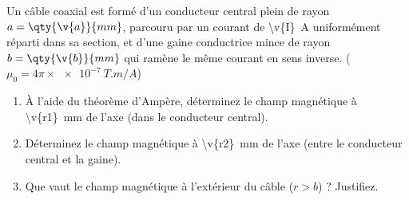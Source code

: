 Un câble coaxial est formé d'un conducteur central plein de rayon $a = \qty{\v{a}}{mm}$, parcouru par un courant de \qty{\v{I}}{A} uniformément réparti dans sa section, et d'une gaine conductrice mince de rayon $b = \qty{\v{b}}{mm}$ qui ramène le même courant en sens inverse. ($\mu_0 = 4\pi \times \qty{e-7}{T.m/A}$)

\begin{enumerate}[label=\alph*)]
    \item À l'aide du théorème d'Ampère, déterminez le champ magnétique à \qty{\v{r1}}{mm} de l'axe (dans le conducteur central).
    \item Déterminez le champ magnétique à \qty{\v{r2}}{mm} de l'axe (entre le conducteur central et la gaine).
    \item Que vaut le champ magnétique à l'extérieur du câble ($r > b$) ? Justifiez.
\end{enumerate}
